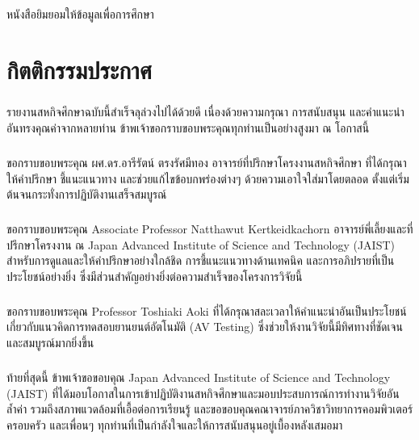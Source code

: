 \documentclass[a4paper,12pt]{report}
\newcommand{\thaipagenum}{
  \ifcase\value{page}
    \or ก%
    \or ข%
    \or ค%
    \or ง%
    \or จ%
    \or ฉ%
    \or ช%
    \or ซ%
    \or ฌ%
    \else หน้า~\thepage %
  \fi
}
\begin{document}
\newpage
\clearpage
\thispagestyle{empty}
\setcounter{page}{0}
หนังสือยิมยอมให้ข้อมูลเพื่อการศึกษา

\newpage
\clearpage
\renewcommand{\thepage}{\thaipagenum}
\setcounter{page}{1}
\chapter*{กิตติกรรมประกาศ}

\paragraph{}
รายงานสหกิจศึกษาฉบับนี้สำเร็จลุล่วงไปได้ด้วยดี เนื่องด้วยความกรุณา การสนับสนุน และคำแนะนำอันทรงคุณค่าจากหลายท่าน ข้าพเจ้าขอกราบขอบพระคุณทุกท่านเป็นอย่างสูงมา ณ โอกาสนี้

\paragraph{}
ขอกราบขอบพระคุณ ผศ.ดร.อารีรัตน์ ตรงรัศมีทอง อาจารย์ที่ปรึกษาโครงงานสหกิจศึกษา ที่ได้กรุณาให้คำปรึกษา ชี้แนะแนวทาง และช่วยแก้ไขข้อบกพร่องต่างๆ ด้วยความเอาใจใส่มาโดยตลอด ตั้งแต่เริ่มต้นจนกระทั่งการปฏิบัติงานเสร็จสมบูรณ์

\paragraph{}
ขอกราบขอบพระคุณ Associate Professor Natthawut Kertkeidkachorn อาจารย์พี่เลี้ยงและที่ปรึกษาโครงงาน ณ Japan Advanced Institute of Science and Technology (JAIST) สำหรับการดูแลและให้คำปรึกษาอย่างใกล้ชิด การชี้แนะแนวทางด้านเทคนิค และการอภิปรายที่เป็นประโยชน์อย่างยิ่ง ซึ่งมีส่วนสำคัญอย่างยิ่งต่อความสำเร็จของโครงการวิจัยนี้

\paragraph{}
ขอกราบขอบพระคุณ Professor Toshiaki Aoki ที่ได้กรุณาสละเวลาให้คำแนะนำอันเป็นประโยชน์เกี่ยวกับแนวคิดการทดสอบยานยนต์อัตโนมัติ (AV Testing) ซึ่งช่วยให้งานวิจัยนี้มีทิศทางที่ชัดเจนและสมบูรณ์มากยิ่งขึ้น

\paragraph{}
ท้ายที่สุดนี้ ข้าพเจ้าขอขอบคุณ Japan Advanced Institute of Science and Technology (JAIST) ที่ได้มอบโอกาสในการเข้าปฏิบัติงานสหกิจศึกษาและมอบประสบการณ์การทำงานวิจัยอันล้ำค่า รวมถึงสภาพแวดล้อมที่เอื้อต่อการเรียนรู้ และขอขอบคุณคณาจารย์ภาควิชาวิทยาการคอมพิวเตอร์ ครอบครัว และเพื่อนๆ ทุกท่านที่เป็นกำลังใจและให้การสนับสนุนอยู่เบื้องหลังเสมอมา
\end{document}

